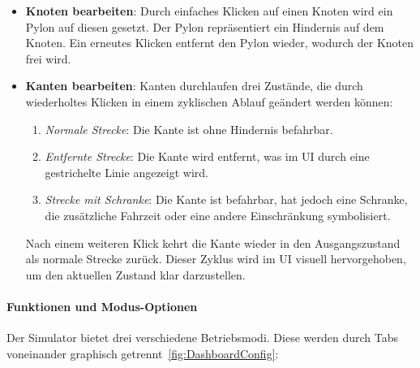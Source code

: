 \documentclass[main.tex]{subfiles} %
\begin{document}
\begin{itemize}
  \item \textbf{Knoten bearbeiten}:
    Durch einfaches Klicken auf einen Knoten wird ein Pylon auf
    diesen gesetzt. Der Pylon repräsentiert ein Hindernis auf dem
    Knoten. Ein erneutes Klicken entfernt den Pylon wieder, wodurch
    der Knoten frei wird.

  \item \textbf{Kanten bearbeiten}:
    Kanten durchlaufen drei Zustände, die durch wiederholtes Klicken
    in einem zyklischen Ablauf geändert werden können:
    \begin{enumerate}
      \item \textit{Normale Strecke}: Die Kante ist ohne Hindernis befahrbar.
      \item \textit{Entfernte Strecke}: Die Kante wird entfernt, was
        im UI durch eine gestrichelte Linie angezeigt wird.
      \item \textit{Strecke mit Schranke}: Die Kante ist befahrbar,
        hat jedoch eine Schranke, die zusätzliche Fahrzeit oder eine
        andere Einschränkung symbolisiert.
    \end{enumerate}
    Nach einem weiteren Klick kehrt die Kante wieder in den
    Ausgangszustand als normale Strecke zurück. Dieser Zyklus wird im
    UI visuell hervorgehoben, um den aktuellen Zustand klar darzustellen.
\end{itemize}

\paragraph{Funktionen und Modus-Optionen}

Der Simulator bietet drei verschiedene Betriebsmodi. Diese werden
durch Tabs voneinander graphisch getrennt~\ref{fig:DashboardConfig}:
\end{document}
